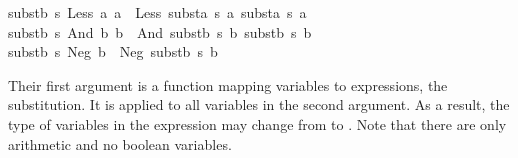 \begin{isabellebody}
\isanewline
{\isachardoublequoteopen}substb\ s\ {\isacharparenleft}Less\ a{}\ a{}{\isacharparenright}\ {\isacharequal}\ Less\ {\isacharparenleft}substa\ s\ a{}{\isacharparenright}\ {\isacharparenleft}substa\ s\ a{}{\isacharparenright}{\isachardoublequoteclose}\ {\isacharbar}\isanewline
{\isachardoublequoteopen}substb\ s\ {\isacharparenleft}And\ b{}\ b{}{\isacharparenright}\ {\isacharequal}\ And\ {\isacharparenleft}substb\ s\ b{}{\isacharparenright}\ {\isacharparenleft}substb\ s\ b{}{\isacharparenright}{\isachardoublequoteclose}\ {\isacharbar}\isanewline
{\isachardoublequoteopen}substb\ s\ {\isacharparenleft}Neg\ b{\isacharparenright}\ {\isacharequal}\ Neg\ {\isacharparenleft}substb\ s\ b{\isacharparenright}{\isachardoublequoteclose}%
\begin{isamarkuptext}%
\noindent
Their first argument is a function mapping variables to expressions, the
substitution. It is applied to all variables in the second argument. As a
result, the type of variables in the expression may change from 
to . Note that there are only arithmetic and no boolean variables.


\end{isamarkuptext}
\end{isabellebody}

